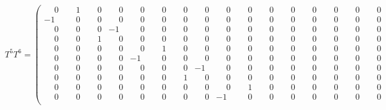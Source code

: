 \documentclass[10pt]{article}
\begin{document}
\[
T^{5}T^{6} = \left(\begin{smallmatrix}
\phantom{-}0 & \phantom{-}1 & \phantom{-}0 & \phantom{-}0 & \phantom{-}0 & \phantom{-}0 & \phantom{-}0 & \phantom{-}0 & \phantom{-}0 & \phantom{-}0 & \phantom{-}0 & \phantom{-}0 & \phantom{-}0 & \phantom{-}0 & \phantom{-}0 & \phantom{-}0 \\
-1 & \phantom{-}0 & \phantom{-}0 & \phantom{-}0 & \phantom{-}0 & \phantom{-}0 & \phantom{-}0 & \phantom{-}0 & \phantom{-}0 & \phantom{-}0 & \phantom{-}0 & \phantom{-}0 & \phantom{-}0 & \phantom{-}0 & \phantom{-}0 & \phantom{-}0 \\
\phantom{-}0 & \phantom{-}0 & \phantom{-}0 & -1 & \phantom{-}0 & \phantom{-}0 & \phantom{-}0 & \phantom{-}0 & \phantom{-}0 & \phantom{-}0 & \phantom{-}0 & \phantom{-}0 & \phantom{-}0 & \phantom{-}0 & \phantom{-}0 & \phantom{-}0 \\
\phantom{-}0 & \phantom{-}0 & \phantom{-}1 & \phantom{-}0 & \phantom{-}0 & \phantom{-}0 & \phantom{-}0 & \phantom{-}0 & \phantom{-}0 & \phantom{-}0 & \phantom{-}0 & \phantom{-}0 & \phantom{-}0 & \phantom{-}0 & \phantom{-}0 & \phantom{-}0 \\
\phantom{-}0 & \phantom{-}0 & \phantom{-}0 & \phantom{-}0 & \phantom{-}0 & \phantom{-}1 & \phantom{-}0 & \phantom{-}0 & \phantom{-}0 & \phantom{-}0 & \phantom{-}0 & \phantom{-}0 & \phantom{-}0 & \phantom{-}0 & \phantom{-}0 & \phantom{-}0 \\
\phantom{-}0 & \phantom{-}0 & \phantom{-}0 & \phantom{-}0 & -1 & \phantom{-}0 & \phantom{-}0 & \phantom{-}0 & \phantom{-}0 & \phantom{-}0 & \phantom{-}0 & \phantom{-}0 & \phantom{-}0 & \phantom{-}0 & \phantom{-}0 & \phantom{-}0 \\
\phantom{-}0 & \phantom{-}0 & \phantom{-}0 & \phantom{-}0 & \phantom{-}0 & \phantom{-}0 & \phantom{-}0 & -1 & \phantom{-}0 & \phantom{-}0 & \phantom{-}0 & \phantom{-}0 & \phantom{-}0 & \phantom{-}0 & \phantom{-}0 & \phantom{-}0 \\
\phantom{-}0 & \phantom{-}0 & \phantom{-}0 & \phantom{-}0 & \phantom{-}0 & \phantom{-}0 & \phantom{-}1 & \phantom{-}0 & \phantom{-}0 & \phantom{-}0 & \phantom{-}0 & \phantom{-}0 & \phantom{-}0 & \phantom{-}0 & \phantom{-}0 & \phantom{-}0 \\
\phantom{-}0 & \phantom{-}0 & \phantom{-}0 & \phantom{-}0 & \phantom{-}0 & \phantom{-}0 & \phantom{-}0 & \phantom{-}0 & \phantom{-}0 & \phantom{-}1 & \phantom{-}0 & \phantom{-}0 & \phantom{-}0 & \phantom{-}0 & \phantom{-}0 & \phantom{-}0 \\
\phantom{-}0 & \phantom{-}0 & \phantom{-}0 & \phantom{-}0 & \phantom{-}0 & \phantom{-}0 & \phantom{-}0 & \phantom{-}0 & -1 & \phantom{-}0 & \phantom{-}0 & \phantom{-}0 & \phantom{-}0 & \phantom{-}0 & \phantom{-}0 & \phantom{-}0 \\

\end{smallmatrix}\]
\end{document}
